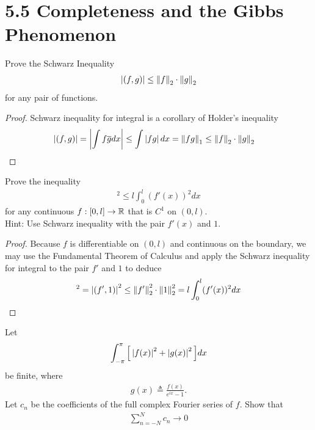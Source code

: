 \documentclass{report}
\begin{document}
\section{5.5 Completeness and the Gibbs Phenomenon} 
\begin{question}{}{}
Prove the Schwarz Inequality 
\begin{align*}
\left| (f,g)\right| \leq \left\| f \right\|_2 \cdot \left\| g \right\|_2
\end{align*}
for any pair of functions. 
\end{question}
\begin{proof}
Schwarz inequality for integral is a corollary of Holder's inequality 
\begin{align*}
\left|(f,g)\right|&= \left|\int f \overline{g}dx\right|\leq \int \left|fg\right|dx = \left\| fg \right\|_1 \leq \left\| f \right\|_2 \cdot \left\| g \right\|_2 
\end{align*}
\end{proof}
\begin{question}{}{}
Prove the inequality 
\begin{align*}
[f(l)-f(0)]^2 \leq l \int_0^l (f'(x))^2 dx 
\end{align*}
for any continuous $f:[0,l]\rightarrow \mathbb{R}$ that is $C^1$ on  $(0,l)$. \\

Hint: Use Schwarz inequality with the pair $f'(x)$ and $1$. 
\end{question}
\begin{proof}
Because $f$ is differentiable on $(0,l)$ and continuous on the boundary, we may use the Fundamental Theorem of Calculus and apply the Schwarz inequality for integral to the pair $f'$ and $1$ to deduce 
 \begin{align*}
[f(l)-f(0)]^2 = \abso{(f',1)}^2  \leq \norm{f'}_2^2 \cdot \norm{1}_2^2 = l \int_0^l (f'(x))^2 dx
\end{align*}
\end{proof}
\begin{question}{}{}
Let 
\begin{align*}
\int_{-\pi }^{\pi } \Big[\left|f(x)\right|^2 + \left|g(x)\right|^2 \Big]dx 
\end{align*}
be finite, where 
\begin{align*}
g(x)\triangleq \frac{f(x)}{e^{ix}-1}. 
\end{align*}
Let $c_n$ be the coefficients of the full complex Fourier series of $f$. Show that 
 \begin{align*}
\sum_{n=-N}^N c_n \to 0
\end{align*}
\end{question}
\end{document}
